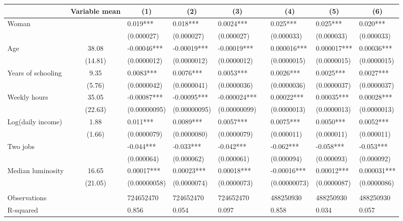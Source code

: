 \begin{tabular}{lclllrlll}
\cmidrule{3-5}\cmidrule{7-9}      & Variable mean & \multicolumn{1}{c}{(1)} & \multicolumn{1}{c}{(2)} & \multicolumn{1}{c}{(3)} &       & \multicolumn{1}{c}{(4)} & \multicolumn{1}{c}{(5)} & \multicolumn{1}{c}{(6)} \\
\midrule
\midrule
Woman &       & 0.019*** & 0.018*** & 0.0024*** &       & 0.025*** & 0.025*** & 0.020*** \\
      &       & (0.000027) & (0.000027) & (0.000027) &       & (0.000033) & (0.000033) & (0.000033) \\
Age   & 38.08 & -0.00046*** & -0.00019*** & -0.00019*** &       & 0.000016*** & 0.000017*** & 0.00036*** \\
      & (14.81) & (0.0000012) & (0.0000012) & (0.0000012) &       & (0.0000015) & (0.0000015) & (0.0000015) \\
Years of schooling & 9.35  & 0.0083*** & 0.0076*** & 0.0053*** &       & 0.0026*** & 0.0025*** & 0.0027*** \\
      & (5.76) & (0.0000042) & (0.0000041) & (0.0000036) &       & (0.0000036) & (0.0000037) & (0.0000037) \\
Weekly hours & 35.05 & -0.00087*** & -0.00095*** & -0.000024*** &       & 0.00022*** & 0.00035*** & 0.00028*** \\
      & (22.63) & (0.00000095) & (0.00000095) & (0.00000099) &       & (0.0000013) & (0.0000013) & (0.0000013) \\
Log(daily income) & 1.88  & 0.011*** & 0.0089*** & 0.0057*** &       & 0.0075*** & 0.0050*** & 0.0052*** \\
      & (1.66) & (0.0000079) & (0.0000080) & (0.0000079) &       & (0.000011) & (0.000011) & (0.000011) \\
Two jobs &       & -0.044*** & -0.033*** & -0.042*** &       & -0.062*** & -0.058*** & -0.053*** \\
      &       & (0.000064) & (0.000062) & (0.000061) &       & (0.000094) & (0.000093) & (0.000092) \\
Median luminosity & 16.65 & 0.00017*** & 0.00023*** & 0.00018*** &       & -0.00016*** & 0.00012*** & 0.000031*** \\
      & (21.05) & (0.00000058) & (0.0000074) & (0.0000073) &       & (0.00000073) & (0.0000087) & (0.0000086) \\
      &       &       &       &       &       &       &       &  \\
\midrule
Observations &       & 724652470 & 724652470 & 724652470 &       & 488250930 & 488250930 & 488250930 \\
R-squared &       & 0.856 & 0.054 & 0.097 &       & 0.858 & 0.034 & 0.057 \\
\bottomrule
\bottomrule
\end{tabular}%
